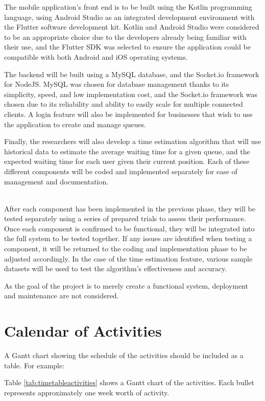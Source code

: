 The mobile application’s front end is to be built using the Kotlin programming language, using Android Studio as an integrated development environment with the Flutter software development kit. Kotlin and Android Studio were considered to be an appropriate choice due to the developers already being familiar with their use, and the Flutter SDK was selected to ensure the application could be compatible with both Android and iOS operating systems.

The backend will be built using a MySQL database, and the Socket.io framework for NodeJS. MySQL was chosen for database management thanks to its simplicity, speed, and low implementation cost, and the Socket.io framework was chosen due to its reliability and ability to easily scale for multiple connected clients.
A login feature will also be implemented for businesses that wish to use the application to create and manage queues.

Finally, the researchers will also develop a time estimation algorithm that will use historical data to estimate the average waiting time for a given queue, and the expected waiting time for each user given their current position.
Each of these different components will be coded and implemented separately for ease of management and documentation.

 \\
After each component has been implemented in the previous phase, they will be tested separately using a series of prepared trials to assess their performance. Once each component is confirmed to be functional, they will be integrated into the full system to be tested together. If any issues are identified when testing a component, it will be returned to the coding and implementation phase to be adjusted accordingly.
In the case of the time estimation feature, various sample datasets will be used to test the algorithm’s effectiveness and accuracy.

As the goal of the project is to merely create a functional system, deployment and maintenance are not considered.


\section{Calendar of Activities}

A Gantt chart showing the schedule of the activities should be included as a table. For example:

Table \ref{tab:timetableactivities} shows a Gantt chart of the activities.  Each bullet represents approximately
one week worth of activity.

